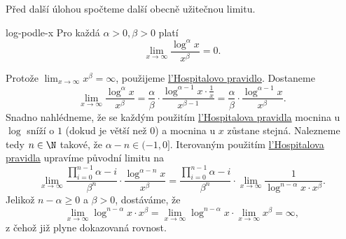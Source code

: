 Před další úlohou spočteme další obecně užitečnou limitu.
\begin{lemma}{}{log-podle-x}
 Pro každá $\alpha>0,\beta>0$ platí
 \[
  \lim_{x \to \infty} \frac{\log^{\alpha}x}{x^{\beta}} = 0.
 \]
\end{lemma}
\begin{lemproof}
 Protože $\lim_{x \to \infty} x^{\beta} = \infty$, použijeme
 \hyperref[thm:lhospitalovo-pravidlo]{l'Hospitalovo pravidlo}. Dostaneme
 \[
  \lim_{x \to \infty} \frac{\log^{\alpha} x}{x^{\beta}} = \frac{\alpha}{\beta}
  \cdot \frac{\log^{\alpha - 1}x \cdot \frac{1}{x}}{x^{\beta - 1}} =
  \frac{\alpha}{\beta} \cdot \frac{\log^{\alpha-1} x}{x^{\beta}}.
 \]
 Snadno nahlédneme, že se každým použitím
 \hyperref[thm:lhospitalovo-pravidlo]{l'Hospitalova pravidla} mocnina u $\log$
 sníží o $1$ (dokud je větší než $0$) a mocnina u $x$ zůstane stejná. Nalezneme
 tedy $n \in \N$ takové, že $\alpha - n \in (-1,0]$. Iterovaným použitím
 \hyperref[thm:lhospitalovo-pravidlo]{l'Hospitalova pravidla} upravíme původní
 limitu na
 \[
  \lim_{x \to \infty} \frac{\prod_{i=0}^{n-1} \alpha - i}{\beta^{n}} \cdot
  \frac{\log^{\alpha - n} x}{x^{\beta}} = \frac{\prod_{i=0}^{n-1} \alpha -
  i}{\beta^{n}} \cdot \lim_{x \to \infty} \frac{1}{\log^{n-\alpha}x \cdot
  x^{\beta}}.
 \]
 Jelikož $n-\alpha \geq 0$ a $\beta>0$, dostáváme, že
 \[
  \lim_{x \to \infty} \log^{n-\alpha}x \cdot x^{\beta} = \lim_{x \to \infty}
  \log^{n-\alpha}x \cdot \lim_{x \to \infty} x^{\beta} = \infty,
 \]
 z čehož již plyne dokazovaná rovnost.
\end{lemproof}

